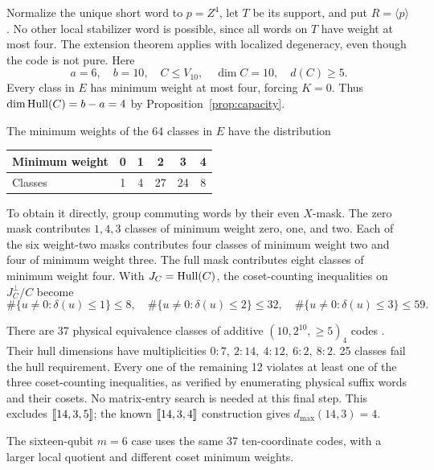 Normalize the unique short word to \(p=Z^4\), let \(T\) be its support,
and put \(R=\langle p\rangle\). No other local stabilizer word is
possible, since all words on \(T\) have weight at most four.
The extension theorem applies with localized degeneracy, even though the
code is not pure. Here
\[
 a=6,\quad b=10,\quad C\leq V_{10},\quad\dim C=10,\quad d(C)\geq5.
\]
Every class in \(E\) has minimum weight at most four, forcing \(K=0\). Thus
\(\dim\operatorname{Hull}(C)=b-a=4\) by Proposition~\ref{prop:capacity}.

The minimum weights of the 64 classes in \(E\) have the distribution
\begin{center}
\begin{tabular}{@{}lccccc@{}}\toprule
Minimum weight&0&1&2&3&4\\\midrule
Classes&1&4&27&24&8\\\bottomrule
\end{tabular}
\end{center}
To obtain it directly, group commuting words by their even \(X\)-mask.
The zero mask contributes \(1,4,3\) classes of minimum weight zero, one, and two.
Each of the six weight-two masks contributes four classes of minimum weight two
and four of minimum weight three. The full mask contributes eight classes of
minimum weight four. With \(J_C=\operatorname{Hull}(C)\), the coset-counting inequalities on
\(J_C^\perp/C\) become
\[
 \#\{u\ne0:\delta(u)\leq1\}\leq8,\quad
 \#\{u\ne0:\delta(u)\leq2\}\leq32,\quad
 \#\{u\ne0:\delta(u)\leq3\}\leq59.
\]

There are 37 physical equivalence classes of additive
\((10,2^{10},\geq5)_4\) codes \cite{dodeca}.
Their hull dimensions have multiplicities
\(0:7,\ 2:14,\ 4:12,\ 6:2,\ 8:2\).
25 classes fail the hull requirement. Every one of the remaining
12 violates at least one of the three coset-counting inequalities, as verified
by enumerating physical suffix words and their cosets. No matrix-entry
search is needed at this final step.
This excludes \([\![14,3,5]\!]\); the known \([\![14,3,4]\!]\)
construction gives \(d_{\max}(14,3)=4\).

The sixteen-qubit \(m=6\) case uses the same 37 ten-coordinate codes,
with a larger local quotient and different coset minimum weights.
